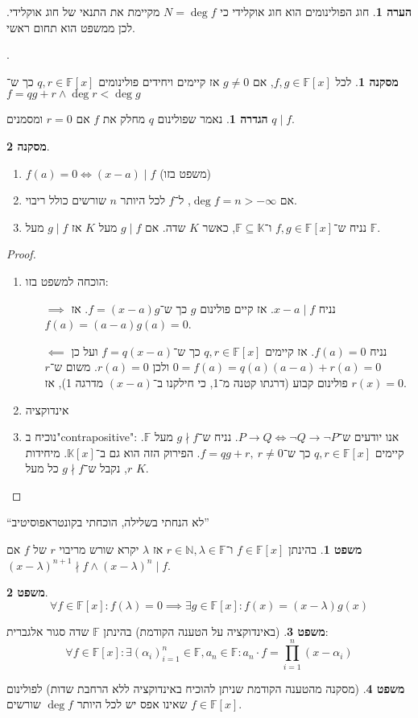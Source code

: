 \documentclass[a4paper]{article}
\newcommand\N     {\mathbb{N}}
\newcommand\K     {\mathbb{K}}
\renewcommand\inf {\infty}
\newcommand\F         {\mathbb{F}}
\newcommand\co        {\colon}
\newcommand\ag        {\alpha}
\renewcommand\lg      {\lambda}
\theoremstyle{definition}
\newtheorem{Theorem}{משפט}
\newtheorem{definition}{הגדרה}
\newtheorem{Remark}{הערה}
\newtheorem{Collary}{מסקנה}
\newcommand\cola [1] {\begin{Collary}#1\end{Collary}}
\newcommand\theo  [1] {\begin{Theorem}#1\end{Theorem}}
\newcommand\defi  [1] {\begin{definition}#1\end{definition}}
\newcommand\rmark [1] {\begin{Remark}#1\end{Remark}}
\begin{document}
	\rmark{חוג הפולינומים הוא חוג אוקלידי כי $N = \deg f$ מקיימת את התנאי של חוג אוקלידי. לכן ממשפט הוא תחום ראשי. }. 
	\cola{לכל $f, g \in \F[x]$, אם $g \neq 0$ אז קיימים ויחידים פולינומים $q, r \in \F[x]$ כך ש־$f = qg + r \land \deg r < \deg g$}
	
	\defi{נאמר שפולינום $q$ מחלק את $f$ אם $r = 0$ ומסמנים $q \mid f$. }
	
	\cola{\,
		\begin{enumerate}
			\item $f(a) = 0 \iff (x - a) \mid f$ (משפט בזו)
			\item אם $\deg f = n > -\inf$, ל־$f$ לכל היותר $n$ שורשים כולל ריבוי. 
			\item נניח ש־$f, g \in \F[x]$ ו־$\F \subseteq \K$, כאשר $K$ שדה. אם $g \mid f$ מעל $K$ אז $g \mid f$ מעל $\F$. 
		\end{enumerate}
	}
	\begin{proof}\,
		\begin{enumerate}
			\item הוכחה למשפט בזו: 
			\begin{itemize}
				\item[$\implies$] נניח $x - a \mid f$. אז קיים פולינום $g$ כך ש־$f = (x - a)g$. אז $f(a) = (a - a)g(a) = 0$. 
				\item[$\impliedby$] נניח $f(a) = 0$. אז קיימים $q, r \in \F[x]$ כך ש־$f = q(x - a)$ ועל כן $0 = f(a) = q(a)(a - a) + r(a) = 0$ ולכן $r(a) = 0$. משום ש־$r$ פולינום קבוע (דרגתו קטנה מ־1, כי חילקנו ב־$(x - a)$ מדרגה 1), אז $r(x) = 0$. 
			\end{itemize}
			\item אינדוקציה
			\item נוכיח ב"contrapositive": אנו יודעים ש־$P \to Q \iff \lnot Q \to \lnot P$. נניח ש־$g \nmid f$ מעל $\F$. קיימים $q, r \in \F[x]$ כך ש־$f =qg + r, \ r \neq 0$. הפירוק הזה הוא גם ב־$\K[x]$. מיחידות $r$, נקבל ש־$g \nmid f$ כל מעל $K$. 
		\end{enumerate}
	\end{proof}
	``לא הנחתי בשלילה, הוכחתי בקונטראפוסיטיב''
	
	\theo{בהינתן $f \in \F[x]$ ו־$r \in \N, \lg \in \F$ אז $\lg$ יקרא שורש מריבוי $r$ של $f$ אם $(x - \lg)^{n + 1} \nmid f \land (x - \lg)^{n} \mid f$. }
	\theo{\[ \forall f\in \F[x] \co f(\lg) = 0 \implies \exists g \in \F[x] \co f(x) = (x - \lg)g(x) \]}
	\theo{(באינדוקציה על הטענה הקודמת) בהינתן $\F$ שדה סגור אלגברית: 
		\[ \forall f \in \F[x] \co \exists (\ag_i)_{i = 1}^{n} \in \F, a_n \in \F \co a_n \cdot f = \prod_{i = 1}^{n}(x - \ag_i) \]}
	\theo{(מסקנה מהטענה הקודמת שניתן להוכיח באינדוקציה ללא הרחבת שדות) לפולינום $f \in \F[x]$ שאינו אפס יש לכל היותר $\deg f$ שורשים. }
	
\end{document}
